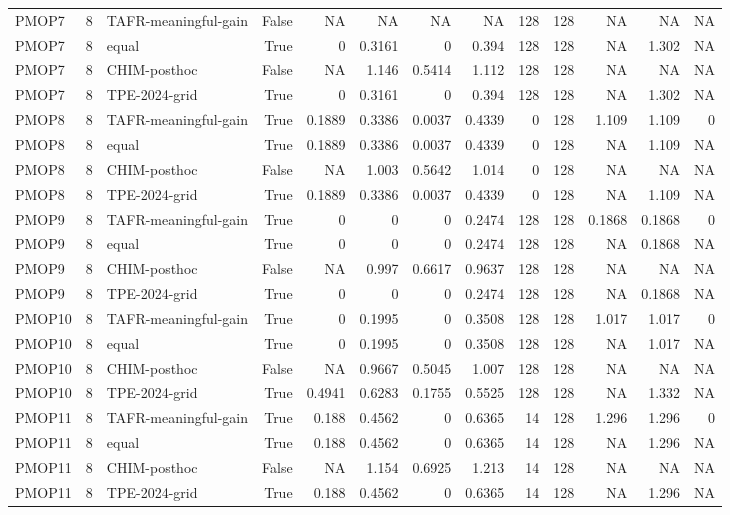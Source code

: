 \begin{tabular}{lrlrrrrrrrrrr}
PMOP7 & 8 & TAFR-meaningful-gain & False & NA & NA & NA & NA & 128 & 128 & NA & NA & NA \\
PMOP7 & 8 & equal & True & 0 & 0.3161 & 0 & 0.394 & 128 & 128 & NA & 1.302 & NA \\
PMOP7 & 8 & CHIM-posthoc & False & NA & 1.146 & 0.5414 & 1.112 & 128 & 128 & NA & NA & NA \\
PMOP7 & 8 & TPE-2024-grid & True & 0 & 0.3161 & 0 & 0.394 & 128 & 128 & NA & 1.302 & NA \\
PMOP8 & 8 & TAFR-meaningful-gain & True & 0.1889 & 0.3386 & 0.0037 & 0.4339 & 0 & 128 & 1.109 & 1.109 & 0 \\
PMOP8 & 8 & equal & True & 0.1889 & 0.3386 & 0.0037 & 0.4339 & 0 & 128 & NA & 1.109 & NA \\
PMOP8 & 8 & CHIM-posthoc & False & NA & 1.003 & 0.5642 & 1.014 & 0 & 128 & NA & NA & NA \\
PMOP8 & 8 & TPE-2024-grid & True & 0.1889 & 0.3386 & 0.0037 & 0.4339 & 0 & 128 & NA & 1.109 & NA \\
PMOP9 & 8 & TAFR-meaningful-gain & True & 0 & 0 & 0 & 0.2474 & 128 & 128 & 0.1868 & 0.1868 & 0 \\
PMOP9 & 8 & equal & True & 0 & 0 & 0 & 0.2474 & 128 & 128 & NA & 0.1868 & NA \\
PMOP9 & 8 & CHIM-posthoc & False & NA & 0.997 & 0.6617 & 0.9637 & 128 & 128 & NA & NA & NA \\
PMOP9 & 8 & TPE-2024-grid & True & 0 & 0 & 0 & 0.2474 & 128 & 128 & NA & 0.1868 & NA \\
PMOP10 & 8 & TAFR-meaningful-gain & True & 0 & 0.1995 & 0 & 0.3508 & 128 & 128 & 1.017 & 1.017 & 0 \\
PMOP10 & 8 & equal & True & 0 & 0.1995 & 0 & 0.3508 & 128 & 128 & NA & 1.017 & NA \\
PMOP10 & 8 & CHIM-posthoc & False & NA & 0.9667 & 0.5045 & 1.007 & 128 & 128 & NA & NA & NA \\
PMOP10 & 8 & TPE-2024-grid & True & 0.4941 & 0.6283 & 0.1755 & 0.5525 & 128 & 128 & NA & 1.332 & NA \\
PMOP11 & 8 & TAFR-meaningful-gain & True & 0.188 & 0.4562 & 0 & 0.6365 & 14 & 128 & 1.296 & 1.296 & 0 \\
PMOP11 & 8 & equal & True & 0.188 & 0.4562 & 0 & 0.6365 & 14 & 128 & NA & 1.296 & NA \\
PMOP11 & 8 & CHIM-posthoc & False & NA & 1.154 & 0.6925 & 1.213 & 14 & 128 & NA & NA & NA \\
PMOP11 & 8 & TPE-2024-grid & True & 0.188 & 0.4562 & 0 & 0.6365 & 14 & 128 & NA & 1.296 & NA \\

\end{tabular}
